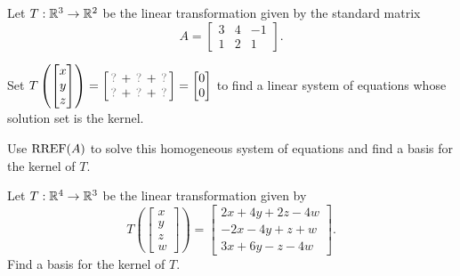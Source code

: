 \begin{activity}{10}
Let \(T: \mathbb{R}^3 \rightarrow \mathbb{R}^2\) be the linear transformation given by the
standard matrix
\[A=\begin{bmatrix} 3 & 4 & -1 \\ 1 & 2 & 1 \end{bmatrix}.\]
\begin{subactivity}
Set
\(
  T\left(\begin{bmatrix}x\\y\\z\end{bmatrix}\right)
    =
  \begin{bmatrix}
    \unknown+\unknown+\unknown \\
    \unknown+\unknown+\unknown
  \end{bmatrix}
    =
  \begin{bmatrix}0\\0\end{bmatrix}
\) to find a linear system of equations whose solution set is the kernel.
\end{subactivity}
\begin{subactivity}
Use \(\operatorname{RREF}(A)\) to solve this homogeneous system of equations and find a basis
for the kernel of \(T\).
\end{subactivity}
\end{activity}

\begin{activity}{10}
Let \(T: \mathbb{R}^4 \rightarrow \mathbb{R}^3\) be the linear transformation given by 
\[ T\left(\begin{bmatrix} x \\ y \\ z \\ w \end{bmatrix} \right) = 
\begin{bmatrix} 2x+4y+2z-4w \\ -2x-4y+z+w \\ 3x+6y-z-4w\end{bmatrix}.\]
\vfill
Find a basis for the kernel of \(T\).
\end{activity}

